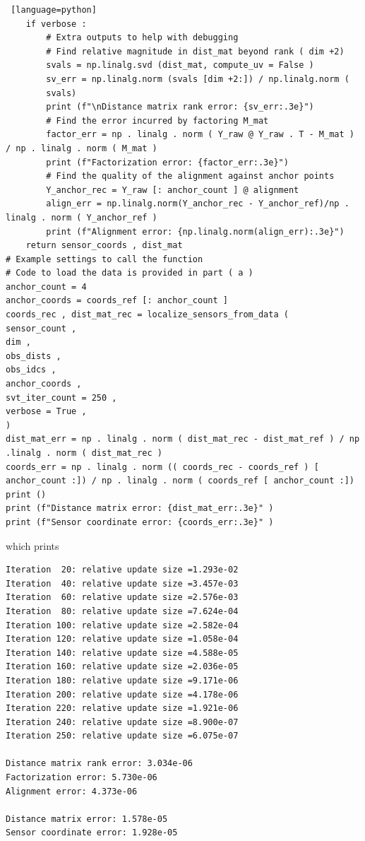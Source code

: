 \documentclass[a4paper, 12pt]{article}
\begin{document}
\begin{lstlisting} [language=python]
    if verbose :
        # Extra outputs to help with debugging
        # Find relative magnitude in dist_mat beyond rank ( dim +2)
        svals = np.linalg.svd (dist_mat, compute_uv = False )
        sv_err = np.linalg.norm (svals [dim +2:]) / np.linalg.norm (
        svals)
        print (f"\nDistance matrix rank error: {sv_err:.3e}")
        # Find the error incurred by factoring M_mat
        factor_err = np . linalg . norm ( Y_raw @ Y_raw . T - M_mat ) / np . linalg . norm ( M_mat )
        print (f"Factorization error: {factor_err:.3e}")
        # Find the quality of the alignment against anchor points
        Y_anchor_rec = Y_raw [: anchor_count ] @ alignment
        align_err = np.linalg.norm(Y_anchor_rec - Y_anchor_ref)/np . linalg . norm ( Y_anchor_ref )
        print (f"Alignment error: {np.linalg.norm(align_err):.3e}")
    return sensor_coords , dist_mat
# Example settings to call the function
# Code to load the data is provided in part ( a )
anchor_count = 4
anchor_coords = coords_ref [: anchor_count ]
coords_rec , dist_mat_rec = localize_sensors_from_data (
sensor_count ,
dim ,
obs_dists ,
obs_idcs ,
anchor_coords ,
svt_iter_count = 250 ,
verbose = True ,
)
dist_mat_err = np . linalg . norm ( dist_mat_rec - dist_mat_ref ) / np .linalg . norm ( dist_mat_rec )
coords_err = np . linalg . norm (( coords_rec - coords_ref ) [
anchor_count :]) / np . linalg . norm ( coords_ref [ anchor_count :])
print ()
print (f"Distance matrix error: {dist_mat_err:.3e}" )
print (f"Sensor coordinate error: {coords_err:.3e}" )
\end{lstlisting}
which prints
\begin{lstlisting}
Iteration  20: relative update size =1.293e-02
Iteration  40: relative update size =3.457e-03
Iteration  60: relative update size =2.576e-03
Iteration  80: relative update size =7.624e-04
Iteration 100: relative update size =2.582e-04
Iteration 120: relative update size =1.058e-04
Iteration 140: relative update size =4.588e-05
Iteration 160: relative update size =2.036e-05
Iteration 180: relative update size =9.171e-06
Iteration 200: relative update size =4.178e-06
Iteration 220: relative update size =1.921e-06
Iteration 240: relative update size =8.900e-07
Iteration 250: relative update size =6.075e-07

Distance matrix rank error: 3.034e-06
Factorization error: 5.730e-06
Alignment error: 4.373e-06

Distance matrix error: 1.578e-05
Sensor coordinate error: 1.928e-05
\end{lstlisting}
\end{document}
